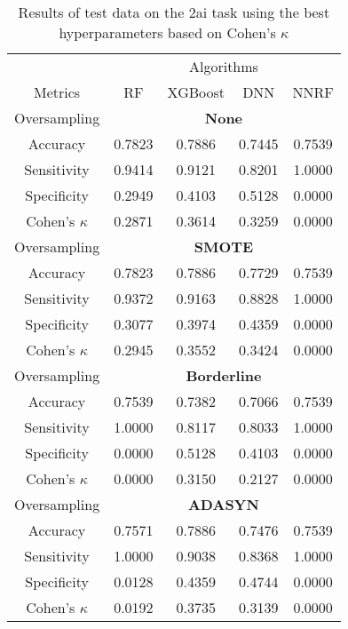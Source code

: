 \begin{table}[!htb]
\centering
\caption{Results of test data on the 2ai task using the best hyperparameters based on Cohen's $\kappa$}
\label{tab:2ai_test_results}
\begin{tabular}{c | c c c c}
\hline
 & \multicolumn{4}{c}{Algorithms}\\ 
Metrics &RF & XGBoost & DNN & NNRF\\ 
\hline
Oversampling &\multicolumn{4}{|c}{\textbf{None}}\\ 
\hline
Accuracy & 0.7823 & 0.7886 & 0.7445 & 0.7539\\ 
Sensitivity & 0.9414 & 0.9121 & 0.8201 & 1.0000\\ 
Specificity & 0.2949 & 0.4103 & 0.5128 & 0.0000\\ 
Cohen's $\kappa$ & 0.2871 & 0.3614 & 0.3259 & 0.0000\\ 
\hline
Oversampling &\multicolumn{4}{|c}{\textbf{SMOTE}}\\ 
\hline
Accuracy & 0.7823 & 0.7886 & 0.7729 & 0.7539\\ 
Sensitivity & 0.9372 & 0.9163 & 0.8828 & 1.0000\\ 
Specificity & 0.3077 & 0.3974 & 0.4359 & 0.0000\\ 
Cohen's $\kappa$ & 0.2945 & 0.3552 & 0.3424 & 0.0000\\ 
\hline
Oversampling &\multicolumn{4}{|c}{\textbf{Borderline}}\\ 
\hline
Accuracy & 0.7539 & 0.7382 & 0.7066 & 0.7539\\ 
Sensitivity & 1.0000 & 0.8117 & 0.8033 & 1.0000\\ 
Specificity & 0.0000 & 0.5128 & 0.4103 & 0.0000\\ 
Cohen's $\kappa$ & 0.0000 & 0.3150 & 0.2127 & 0.0000\\ 
\hline
Oversampling &\multicolumn{4}{|c}{\textbf{ADASYN}}\\ 
\hline
Accuracy & 0.7571 & 0.7886 & 0.7476 & 0.7539\\ 
Sensitivity & 1.0000 & 0.9038 & 0.8368 & 1.0000\\ 
Specificity & 0.0128 & 0.4359 & 0.4744 & 0.0000\\ 
Cohen's $\kappa$ & 0.0192 & 0.3735 & 0.3139 & 0.0000\\ 
\hline
\end{tabular}
\end{table}


